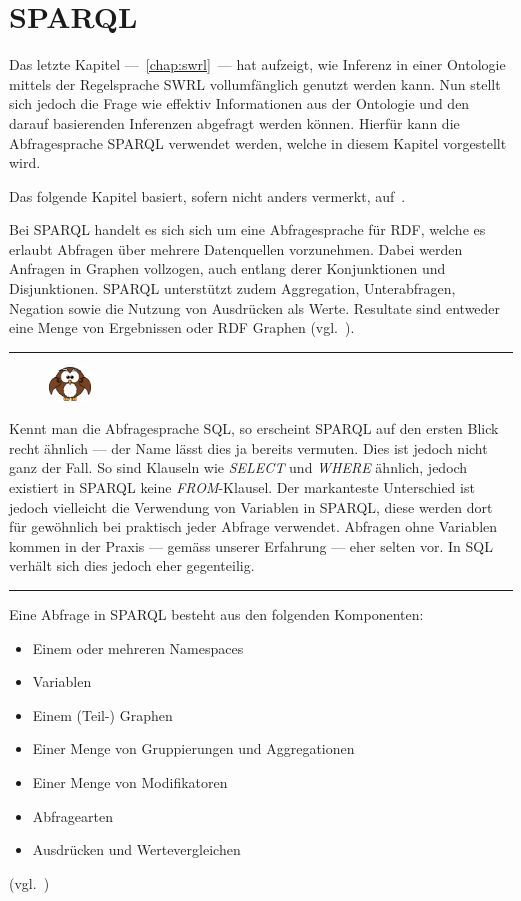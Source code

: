 \chapter{SPARQL}
\label{chap:sparql}
Das letzte Kapitel ---~\ref{chap:swrl}~--- hat aufzeigt, wie Inferenz in einer Ontologie mittels der Regelsprache SWRL vollumfänglich genutzt werden kann. Nun stellt sich jedoch die Frage wie effektiv Informationen aus der Ontologie und den darauf basierenden Inferenzen abgefragt werden können. Hierfür kann die Abfragesprache SPARQL verwendet werden, welche in diesem Kapitel vorgestellt wird.

Das folgende Kapitel basiert, sofern nicht anders vermerkt, auf~\cite{w3sparql_querylang}.

Bei SPARQL handelt es sich sich um eine Abfragesprache für RDF, welche es erlaubt Abfragen über mehrere Datenquellen vorzunehmen. Dabei werden Anfragen in Graphen vollzogen, auch entlang derer Konjunktionen und Disjunktionen. SPARQL unterstützt zudem Aggregation, Unterabfragen, Negation sowie die Nutzung von Ausdrücken als Werte. Resultate sind entweder eine Menge von Ergebnissen oder RDF Graphen (vgl.~\cite[Abstract]{w3sparql_querylang}).

\noindent\rule[1ex]{\textwidth}{1pt}
\begin{figure}
    \vspace{-12pt}
    \includegraphics[width=0.1\textwidth]{bilder/owl.png}
\end{figure}
Kennt man die Abfragesprache SQL, so erscheint SPARQL auf den ersten Blick recht ähnlich --- der Name lässt dies ja bereits vermuten. Dies ist jedoch nicht ganz der Fall. So sind Klauseln wie \textit{SELECT} und \textit{WHERE} ähnlich, jedoch existiert in SPARQL keine \textit{FROM}-Klausel.
Der markanteste Unterschied ist jedoch vielleicht die Verwendung von Variablen in SPARQL, diese werden dort für gewöhnlich bei praktisch jeder Abfrage verwendet. Abfragen ohne Variablen kommen in der Praxis --- gemäss unserer Erfahrung --- eher selten vor. In SQL verhält sich dies jedoch eher gegenteilig.
\noindent\rule[1ex]{\textwidth}{1pt}

Eine Abfrage in SPARQL besteht aus den folgenden Komponenten:
\begin{itemize}
    \item Einem oder mehreren Namespaces
    \item Variablen
    \item Einem (Teil-) Graphen
    \item Einer Menge von Gruppierungen und Aggregationen
    \item Einer Menge von Modifikatoren
    \item Abfragearten
    \item Ausdrücken und Wertevergleichen
\end{itemize}
(vgl.~\cite[18.1.10 SPARQL Query]{w3sparql_querylang})

